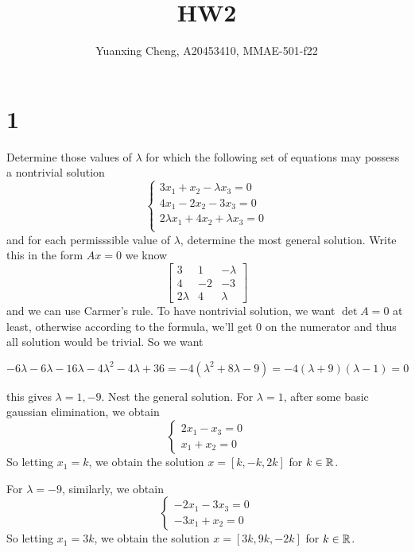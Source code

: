 \documentclass{article}
\title{HW2}
\author{Yuanxing Cheng, A20453410, MMAE-501-f22}
\begin{document}
\maketitle

\section*{1}

\begin{myleftlinebox}
    Determine those values of \(\lambda\) for which the following set of equations may possess a nontrivial solution
    \[
        \begin{cases}
            3 x_1+x_2-\lambda x_3 = 0\\
            4 x_1 -2x_2- 3 x_3 = 0\\
            2\lambda x_1+4x_2+\lambda x_3 = 0\\
        \end{cases}
    \]
    and for each permisssible value of \(\lambda\), determine the most general solution.
    \tcblower
    Write this in the form \(Ax=0\) we know 
    \[\begin{bmatrix}
        3 & 1 & -\lambda\\
        4 & -2 & -3\\
        2\lambda & 4 & \lambda
    \end{bmatrix}\]
    and we can use Carmer's rule. To have nontrivial solution, we want \(\det A= 0\) at least, otherwise according to the formula, we'll get \(0\) on the numerator and thus all solution would be trivial. So we want

    \[-6\lambda-6\lambda-16\lambda-4\lambda^2-4\lambda+36 = -4(\lambda^2+8\lambda-9) = -4(\lambda+9)(\lambda-1)=0\]

    this gives \(\lambda= 1, -9\). Nest the general solution. For \(\lambda=1\), after some basic gaussian elimination, we obtain
    \[
        \begin{cases}
            2x_1-x_3 = 0\\
            x_1+x_2 = 0
        \end{cases}
    \]
    So letting \(x_1 = k\), we obtain the solution \(x = [k,-k,2k]\) for \(k\in\mathbb{R}\).
    
    For \(\lambda=-9\), similarly, we obtain
    \[
        \begin{cases}
            -2x_1-3x_3 = 0\\
            -3x_1+x_2 = 0
        \end{cases}
    \]
    So letting \(x_1 = 3k\), we obtain the solution \(x = [3k,9k,-2k]\) for \(k\in\mathbb{R}\).

\end{myleftlinebox}
\end{document}

